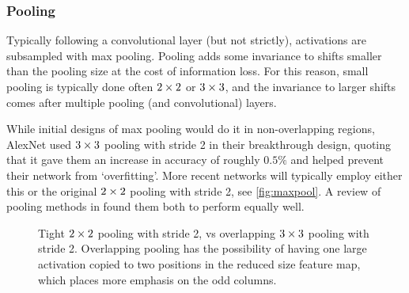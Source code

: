 \subsubsection{Pooling}
  Typically following a convolutional layer (but not strictly), activations are subsampled with
  max pooling. Pooling adds some invariance to shifts smaller than the pooling
  size at the cost of information loss. For this reason, small pooling is
  typically done often $2\times 2$ or $3\times 3$, and the invariance to larger shifts
  comes after multiple pooling (and convolutional) layers.
  
  While initial designs of max pooling would do it in non-overlapping regions, 
  AlexNet used $3\times 3$ pooling with stride 2 in their breakthrough design,
  quoting that it gave them an increase in accuracy of roughly $0.5\%$ and
  helped prevent their network from `overfitting'. More recent networks will
  typically employ either this or the original $2\times 2$ pooling with stride 2,
  see \autoref{fig:maxpool}. A review of pooling methods in
  \citep{mishkin_systematic_2016} found them both to perform equally well.
  
  \begin{figure}
    \centering
    \centering
    \caption[Tight vs.\ overlapping pooling]
            { Tight $2\times 2$ pooling with stride 2, vs
             overlapping $3\times 3$ pooling with
            stride 2. Overlapping pooling has the possibility of having one
            large activation copied to two positions in the reduced size
            feature map, which places more emphasis on the odd columns.}
    \label{fig:maxpool}
  \end{figure}

